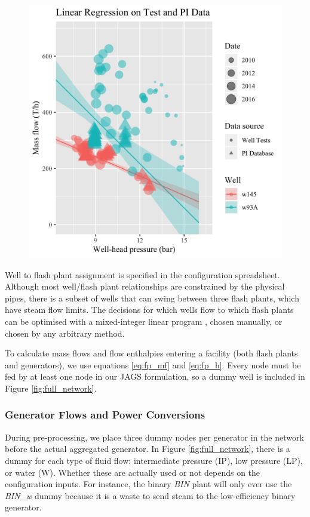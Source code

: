\documentclass[a4paper, 12pt]{article}
\begin{document}
\begin{figure}
\begin{minipage}[t]{.48\textwidth}
  \includegraphics[width=\linewidth]{media/production_curve}
  \label{fig:production_curve}
\end{minipage}
\end{figure}

Well to flash plant assignment is specified in the configuration spreadsheet. Although most well/flash plant relationships are constrained by the physical pipes, there is a subset of wells that can swing between three flash plants, which have steam flow limits. The decisions for which wells flow to which flash plants can be optimised with a mixed-integer linear program \citep{Fox:2018}, chosen manually, or chosen by any arbitrary method.

To calculate mass flows and flow enthalpies entering a facility (both flash plants and generators), we use equations \ref{eq:fp_mf} and \ref{eq:fp_h}. Every node must be fed by at least one node in our JAGS formulation, so a dummy well is included in Figure \ref{fig:full_network}.

\subsubsection{Generator Flows and Power Conversions}
During pre-processing, we place three dummy nodes per generator in the network before the actual aggregated generator. In Figure \ref{fig:full_network}, there is a dummy for each type of fluid flow: intermediate pressure (IP), low pressure (LP), or water (W). Whether these are actually used or not depends on the configuration inputs. For instance, the binary \emph{BIN} plant will only ever use the \emph{BIN\_w} dummy because it is a waste to send steam to the low-efficiency binary generator.
\end{document}
